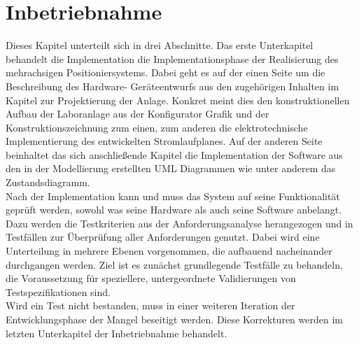 \documentclass[../../Bachelorarbeit.tex]{subfiles}
\begin{document}
\section{Inbetriebnahme}
Dieses Kapitel unterteilt sich in drei Abschnitte. Das erste Unterkapitel behandelt die Implementation \bzw die Implementationsphase der Realisierung des mehrachsigen Positioniersystems. Dabei geht es auf der einen Seite um die Beschreibung des Hardware- \bzw Geräteentwurfs aus den zugehörigen Inhalten im Kapitel zur Projektierung der Anlage. Konkret meint dies den konstruktionellen Aufbau der Laboranlage aus der Konfigurator Grafik und der Konstruktionszeichnung zum einen, zum anderen die elektrotechnische Implementierung des entwickelten Stromlaufplanes. Auf der anderen Seite beinhaltet das sich anschließende Kapitel die Implementation der Software aus den in der Modellierung erstellten UML Diagrammen wie unter anderem das Zustandsdiagramm.\\
Nach der Implementation kann und muss das System auf seine Funktionalität geprüft werden, sowohl was seine Hardware als auch seine Software anbelangt. Dazu werden die Testkriterien aus der Anforderungsanalyse herangezogen und in Testfällen zur Überprüfung aller Anforderungen genutzt. Dabei wird eine Unterteilung in mehrere Ebenen vorgenommen, die aufbauend nacheinander durchgangen werden. Ziel ist es zunächst grundlegende Testfälle zu behandeln, die Voraussetzung für speziellere, untergeordnete Validierungen von Testspezifikationen sind. \\
Wird ein Test nicht bestanden, muss in einer weiteren Iteration der Entwicklungsphase der Mangel beseitigt werden. Diese Korrekturen werden im letzten Unterkapitel der Inbetriebnahme behandelt. 
\end{document}
